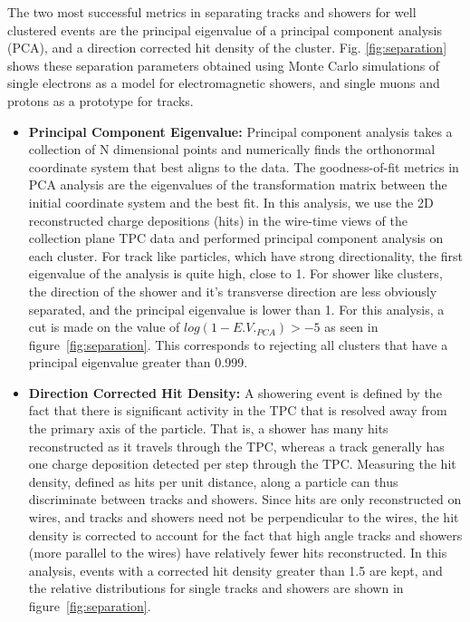 The two most successful metrics in separating tracks and showers for well clustered events are the principal eigenvalue of a principal component analysis (PCA), and a direction corrected hit density of the cluster.  Fig. \ref{fig:separation} shows these separation parameters obtained using Monte Carlo simulations of single electrons as a model for electromagnetic showers, and single muons and protons as a prototype for tracks. 
\begin{itemize}
  \item {\bf Principal Component Eigenvalue:} Principal component analysis takes a collection of N dimensional points and numerically finds the orthonormal coordinate system that best aligns to the data.  The goodness-of-fit metrics in PCA analysis are the eigenvalues of the transformation matrix between the initial coordinate system and the best fit.  In this analysis, we use the 2D reconstructed charge depositions (hits) in the wire-time views of the collection plane TPC data and performed principal component analysis on each cluster.  For track like particles, which have strong directionality, the first eigenvalue of the analysis is quite high, close to 1.  For shower like clusters, the direction of the shower and it's transverse direction are less obviously separated, and the principal eigenvalue is lower than 1.  For this analysis, a cut is made on the value of $log(1-E.V._{PCA}) > -5$ as seen in figure~\ref{fig:separation}.  This corresponds to rejecting all clusters that have a principal eigenvalue greater than 0.999.
  \item{\bf Direction Corrected Hit Density:}  A showering event is defined by the fact that there is significant activity in the TPC that is resolved away from the primary axis of the particle.  That is, a shower has many hits reconstructed as it travels through the TPC, whereas a track generally has one charge deposition detected per step through the TPC.  Measuring the hit density, defined as hits per unit distance, along a particle can thus discriminate between tracks and showers.  Since hits are only reconstructed on wires, and tracks and showers need not be perpendicular to the wires, the hit density is corrected to account for the fact that high angle tracks and showers (more parallel to the wires) have relatively fewer hits reconstructed.  In this analysis, events with a corrected hit density greater than 1.5 are kept, and the relative distributions for single tracks and showers are shown in figure~\ref{fig:separation}.
 \end{itemize}

